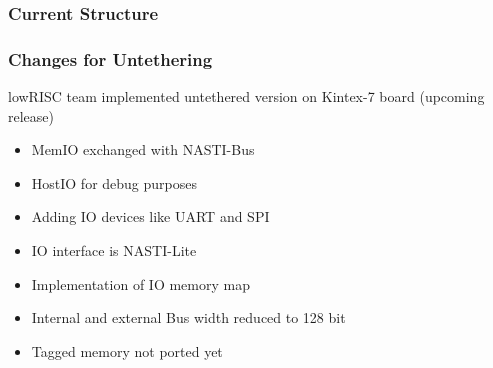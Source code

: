 \documentclass{beamer}
\begin{document}
\begin{frame}
	\frametitle{Current Structure}
	\begin{figure}[!h]
		\begin{center}
	\end{center}
	\end{figure}
\end{frame}

\begin{frame}
	\frametitle{Changes for Untethering}
	lowRISC team implemented untethered version on Kintex-7 board (upcoming release)
	\begin{itemize}
	\item MemIO exchanged with NASTI-Bus %
	\item HostIO for debug purposes
	\item Adding IO devices like UART and SPI
	\item IO interface is NASTI-Lite
	\item Implementation of IO memory map
	\item Internal and external Bus width reduced to 128 bit %
	\item Tagged memory not ported yet
	\end{itemize}
\end{frame}
\end{document}

